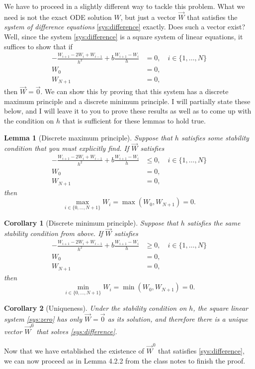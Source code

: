 \documentclass{article}
\theoremstyle{definition}
\theoremstyle{plain}
\newtheorem{corollary}{Corollary}
\newtheorem{lemma}{Lemma}
\theoremstyle{remark}
\begin{document}
We have to proceed in a slightly different way to tackle this problem.
What we need is not the exact ODE solution $W$, but just a vector $\vec W$ that satisfies the \emph{system of difference equations} \eqref{sys:difference} exactly.
Does such a vector exist?
Well, since the system \eqref{sys:difference} is a square system of linear equations, it suffices to show that if
\begin{subequations}\label{sys:zero}
	\begin{align}
		-\frac{W_{i+1}-2W_i+W_{i-1}}{h^2} + b\frac{W_{i+1}-W_i}{h} & = 0, \quad i \in \{1,\dots,N\} \\
		W_0                                                        & = 0,                           \\
		W_{N+1}                                                    & = 0,
	\end{align}
\end{subequations}
then $\vec W = \vec 0$.
We can show this by proving that this system has a discrete maximum principle and a discrete minimum principle.
I will partially state these below, and I will leave it to you to prove these results as well as to come up with the condition on $h$ that is sufficient for these lemmas to hold true.
\begin{lemma}[Discrete maximum principle]
	Suppose that $h$ satisfies some stability condition that you must explicitly find.
	If $\vec W$ satisfies
	\begin{align*}
		-\frac{W_{i+1}-2W_i+W_{i-1}}{h^2} + b\frac{W_{i+1}-W_i}{h} & \leq 0, \quad i \in \{1,\dots,N\} \\
		W_0                                                        & = 0,                              \\
		W_{N+1}                                                    & = 0,
	\end{align*}
	then
	\[\max_{i\in\{0,\dots,N+1\}}W_i = \max(W_0,W_{N+1}) = 0.\]
\end{lemma}
\begin{corollary}[Discrete minimum principle]
	Suppose that $h$ satisfies the same stability condition from above.
	If $\vec W$ satisfies
	\begin{align*}
		-\frac{W_{i+1}-2W_i+W_{i-1}}{h^2} + b\frac{W_{i+1}-W_i}{h} & \geq 0, \quad i \in \{1,\dots,N\} \\
		W_0                                                        & = 0,                              \\
		W_{N+1}                                                    & = 0,
	\end{align*}
	then
	\[\min_{i\in\{0,\dots,N+1\}}W_i = \min(W_0,W_{N+1}) = 0.\]
\end{corollary}
\begin{corollary}[Uniqueness]
	Under the stability condition on $h$, the square linear system \eqref{sys:zero} has only $\vec W = \vec 0$ as its solution, and therefore there is a unique vector $\vec W^0$ that solves \eqref{sys:difference}.
\end{corollary}
Now that we have established the existence of $\vec W^0$ that satisfies \eqref{sys:difference}, we can now proceed as in Lemma 4.2.2 from the class notes to finish the proof.
\end{document}
